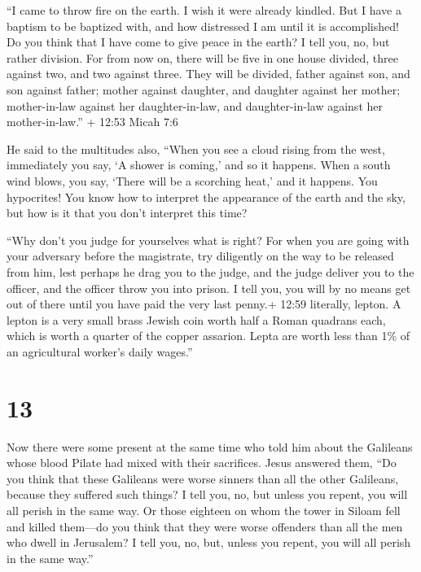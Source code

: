  ``I came to throw fire on the earth. I wish it were
already kindled.  But I have a baptism to be baptized with,
and how distressed I am until it is accomplished!  Do you
think that I have come to give peace in the earth? I tell you, no, but
rather division.  For from now on, there will be five in
one house divided, three against two, and two against three.
 They will be divided, father against son, and son against
father; mother against daughter, and daughter against her mother;
mother-in-law against her daughter-in-law, and daughter-in-law against
her mother-in-law.'' + 12:53 Micah 7:6

 He said to the multitudes also, ``When you see a cloud
rising from the west, immediately you say, `A shower is coming,' and so
it happens.  When a south wind blows, you say, `There will
be a scorching heat,' and it happens.  You hypocrites! You
know how to interpret the appearance of the earth and the sky, but how
is it that you don't interpret this time?

 ``Why don't you judge for yourselves what is right?
 For when you are going with your adversary before the
magistrate, try diligently on the way to be released from him, lest
perhaps he drag you to the judge, and the judge deliver you to the
officer, and the officer throw you into prison.  I tell
you, you will by no means get out of there until you have paid the very
last penny.+ 12:59 literally, lepton. A lepton is a very small brass
Jewish coin worth half a Roman quadrans each, which is worth a quarter
of the copper assarion. Lepta are worth less than 1\% of an agricultural
worker's daily wages.''

\hypertarget{section-12}{%
\section{13}\label{section-12}}

 Now there were some present at the same time who told him
about the Galileans whose blood Pilate had mixed with their sacrifices.
 Jesus answered them, ``Do you think that these Galileans
were worse sinners than all the other Galileans, because they suffered
such things?  I tell you, no, but unless you repent, you
will all perish in the same way.  Or those eighteen on whom
the tower in Siloam fell and killed them---do you think that they were
worse offenders than all the men who dwell in Jerusalem?  I
tell you, no, but, unless you repent, you will all perish in the same
way.''

